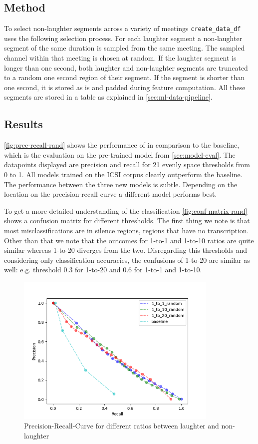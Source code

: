 \documentclass[bsc,frontabs,parskip,deptreport]{infthesis}
\begin{document}
\subsection{Method}
To select non-laughter segments across a variety of meetings \verb|create_data_df| uses the following selection process.
For each laughter segment a non-laughter segment of the same duration is sampled from the same meeting. The sampled channel within that meeting is chosen at random.
If the laughter segment is longer than one second, both laughter and non-laughter segments are truncated to a random one second region of their segment. 
If the segment is shorter than one second, it is stored as is and padded during feature computation.
All these segments are stored in a table as explained in \autoref{sec:ml-data-pipeline}.

\subsection{Results} \label{sec:exp1-res}
\autoref{fig:prec-recall-rand} shows the performance of in comparison to the baseline, which is the evaluation on the pre-trained model from \autoref{sec:model-eval}. The datapoints displayed are precision and recall for 21 evenly space thresholds from 0 to 1. All models trained on the ICSI corpus clearly outperform the baseline. The performance between the three new models is subtle. Depending on the location on the precision-recall curve a different model performs best.

To get a more detailed understanding of the classification \autoref{fig:conf-matrix-rand} shows a confusion matrix for different thresholds. The first thing we note is that most misclassifications are in silence regions, regions that have no transcription. Other than that we note that the outcomes for 1-to-1 and 1-to-10 ratios are quite similar whereas 1-to-20 diverges from the two. Disregarding this thresholds and considering only classification accuracies, the confusions of 1-to-20 are similar as well: e.g. threshold 0.3 for 1-to-20 and 0.6 for 1-to-1 and 1-to-10.

\begin{figure}
    \centering
    \includegraphics[width = 3.8in]{imgs/prec-recall/random/dev_compare_class_balance_dev_set.png}
    \caption{Precision-Recall-Curve for different ratios between laughter and non-laughter}
    \label{fig:prec-recall-rand}
\end{figure}
\end{document}
